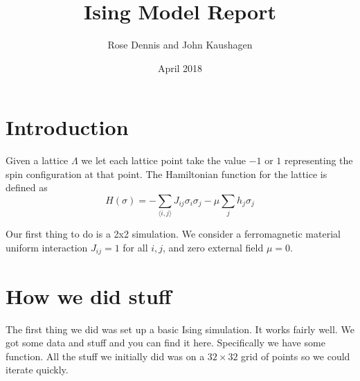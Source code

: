 \documentclass{article}
\title{Ising Model Report}
\author{Rose Dennis and John Kaushagen}
\date{April 2018}
\begin{document}
\maketitle

\section{Introduction}
Given a lattice $\Lambda$ we let each lattice point take the value $-1$  or $1$
representing the spin configuration at that point. The Hamiltonian function for
the lattice is defined as
\[
    H(\sigma) = -\sum_{\langle i,j\rangle}J_{ij}\sigma_i\sigma_j
    -\mu\sum_{j}h_j\sigma_j
\]

Our first thing to do is a 2x2 simulation. We consider a ferromagnetic material
uniform interaction $J_{ij}=1$ for all $i,j$, and zero external field $\mu=0$.

\section{How we did stuff}
The first thing we did was set up a basic Ising simulation. It works fairly
well. We got some data and stuff and you can find it here. Specifically we
have some function. All the stuff we initially did was on a $32\times32$ grid
of points so we could iterate quickly.
\end{document}
